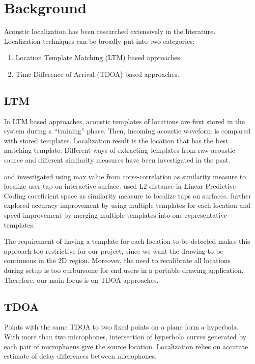 \section{Background}
Acoustic localization has been researched extensively in the literature. Localization techniques can be broadly put into two categories:
\begin{enumerate}
\item Location Template Matching (LTM) based approaches.
\item Time Difference of Arrival (TDOA) based approaches.
\end{enumerate}

\subsection{LTM}
In LTM based approaches, acoustic templates of locations are first stored in the system during a ``training'' phase. Then, incoming acoustic waveform is compared with stored templates. Localization result is the location that has the best matching template. Different ways of extracting templates from raw acoustic source and different similarity measures have been investigated in the past. 

\cite{extended:tusi} and \cite{ltm:pham} investigated using max value from corss-correlation as similarity measure to localize user tap on interactive surface. \cite{ltm:lpc} used L2 distance in Linear Predictive Coding coeeficient space as similarity measure to localize taps on surfaces. \cite{ltm:tusi2} further explored accuracy improvement by using multiple templates for each location and speed improvement by merging multiple templates into one representative templates.

The requirement of having a template for each location to be detected makes this approach too restrictive for our project, since we want the drawing to be continuous in the 2D region.  Moreover, the need to recalibrate all locations during setup is too curbursome for end users in a portable drawing application. Therefore, our main focus is on TDOA approaches.

\subsection{TDOA}
Points with the same TDOA to two fixed points on a plane form a hyperbola. With more than two microphones, intersection of hyperbola curves generated by each pair of microphoens give the source location.  Localization relies on accurate estimate of delay differences between microphones. 

